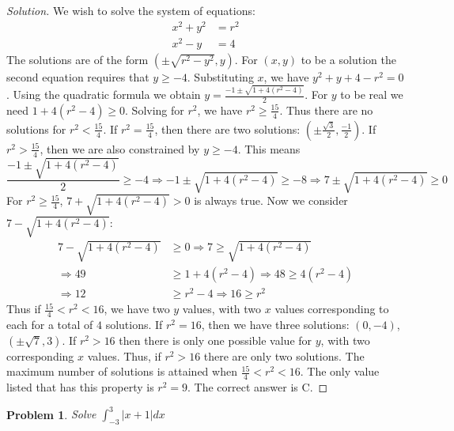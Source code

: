 \documentclass[crop=false,class=book]{standalone}
\theoremstyle{mystyle}
\newtheorem{problem}{Problem}[section]
\begin{document}
\begin{proof}[Solution]
We wish to solve the system of equations:
\begin{align*}
    x^{2}+y^{2}&=r^{2}\\
    x^{2}-y&=4
\end{align*}
The solutions are of the form $(\pm \sqrt{r^2-y^2},y)$. For $(x,y)$ to be a solution the second equation requires that $y\geq -4$. Substituting $x$, we have $y^2+y+4 - r^2 = 0$. Using the quadratic formula we obtain $y = \frac{-1 \pm \sqrt{1 + 4(r^2-4)}}{2}$. For $y$ to be real we need $1+4(r^2-4) \geq 0$. Solving for $r^2$, we have $r^2 \geq \frac{15}{4}$. Thus there are no solutions for $r^2< \frac{15}{4}$. If $r^2 = \frac{15}{4}$, then there are two solutions: $(\pm \frac{\sqrt{3}}{2}, \frac{-1}{2})$. If $r^2 > \frac{15}{4}$, then we are also constrained by $y\geq -4$. This means 
\begin{equation*}
    \frac{-1\pm\sqrt{1+4(r^{2}-4)}}{2}\geq -4\Rightarrow -1\pm\sqrt{1+4(r^{2}-4)}\geq -8\Rightarrow 7\pm\sqrt{1+4(r^{2}-4)}\geq 0
\end{equation*}
 For $r^2 \geq \frac{15}{4}$, $7+\sqrt{1+4(r^2-4)}>0$ is always true. Now we consider $7-\sqrt{1+4(r^2-4)}:$
\begin{align*}
    7-\sqrt{1+4(r^{2}-4)}&\geq 0\Rightarrow 7\geq\sqrt{1+4(r^{2}-4)}\\
    \Rightarrow 49&\geq 1+4(r^{2}-4)\Rightarrow 48\geq 4(r^{2}-4)\\
    \Rightarrow 12&\geq r^{2}-4\Rightarrow 16\geq r^{2}
\end{align*}
Thus if $\frac{15}{4}<r^2<16$, we have two $y$ values, with two $x$ values corresponding to each for a total of $4$ solutions. If $r^2 = 16$, then we have three solutions: $(0,-4)$, $(\pm \sqrt{7},3)$. If $r^2>16$ then there is only one possible value for $y$, with two corresponding $x$ values. Thus, if $r^2>16$ there are only two solutions. The maximum number of solutions is attained when $\frac{15}{4} < r^2 <16$. The only value listed that has this property is $r^2 = 9$. The correct answer is C.
\end{proof}
\begin{problem}
Solve $\int_{-3}^{3}|x+1|dx$
\end{problem}
\end{document}
